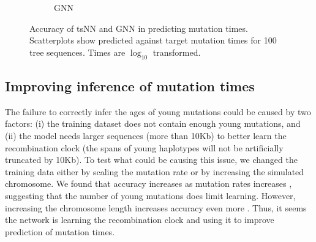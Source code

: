 \begin{figure}[htp]
\begin{subfigure}[b]{.51\linewidth}
\caption{GNN}\label{fig:10kb_gnn}
\end{subfigure}
\caption[Accuracy of tsNN and GNN in predicting mutation times]{
Accuracy of tsNN and GNN in predicting mutation times.
Scatterplots show predicted against target mutation times for 100 tree sequences.
Times are $\log_{10}$ transformed.
}
\label{fig:tsnn_vs_gnn}
\end{figure}

\subsection{Improving inference of mutation times}

The failure to correctly infer the ages of young mutations could be caused by two factors: 
(i) the training dataset does not contain enough young mutations, and
(ii) the model needs larger sequences (more than 10Kb) to better learn the recombination clock (\ie the spans of young haplotypes will not be artificially truncated by 10Kb).
To test what could be causing this issue,
we changed the training data either by scaling the mutation rate or by increasing the simulated chromosome.
We found that accuracy increases as mutation rates increases ,
suggesting that the number of young mutations does limit learning.
However, increasing the chromosome length increases accuracy even more .
Thus, it seems the network is learning the recombination clock and using it to improve prediction of mutation times.

